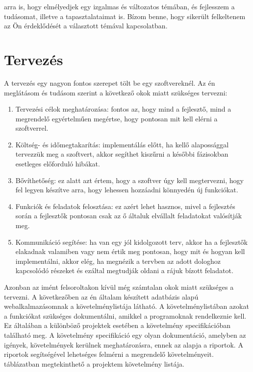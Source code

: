 \documentclass[]{thesis-ekf}
\theoremstyle{definition}
\theoremstyle{remark}
\begin{document}
arra is, hogy elmélyedjek egy izgalmas és változatos témában, és fejlesszem a tudásomat, illetve a tapasztalataimat is. Bízom benne, hogy sikerült felkeltenem az Ön érdeklődését a választott témával kapcsolatban. 
	
	\chapter{Tervezés}
		A tervezés egy nagyon fontos szerepet tölt be egy szoftvereknél. Az én meglátásom és tudásom szerint a következő okok miatt szükséges tervezni:
		\begin{enumerate}
			\item Tervezési célok meghatározása: fontos az, hogy mind a fejlesztő, mind a megrendelő egyértelműen megértse, hogy pontosan mit kell elérni a szoftverrel.
			\item Költség- és időmegtakarítás: implementálás előtt, ha kellő alapossággal tervezzük meg a szoftvert, akkor segíthet kiszűrni a későbbi fázisokban esetleges előforduló hibákat. 
			\item Bővíthetőség: ez alatt azt értem, hogy a szoftver úgy kell megtervezni, hogy fel legyen készítve arra, hogy lehessen hozzáadni könnyedén új funkciókat.
			\item Funkciók és feladatok felosztása: ez azért lehet hasznos, mivel a fejlesztés során a fejlesztők pontosan csak az ő általuk elvállalt feladatokat valósítják meg.
			\item Kommunikáció segítése: ha van egy jól kidolgozott terv, akkor ha a fejlesztők elakadnak valamiben vagy nem értik meg pontosan, hogy mit és hogyan kell implementálni, akkor elég, ha megnézik a tervben az adott dologhoz kapcsolódó részeket és ezáltal megtudják oldani a rájuk bízott feladatot.
		\end{enumerate}
		Azonban az imént felsoroltakon kívül még számtalan okok miatt szükséges a tervezni. A következőben az én általam készített adatbázis alapú webalkalmazásomnak a követelménylistája látható. A követelménylistában azokat a funkciókat szükséges dokumentálni, amikkel a programoknak rendelkeznie kell. Ez általában a különböző projektek esetében a követelmény specifikációban található meg. A követelmény specifikáció egy olyan dokumentáció, amelyben az igények, követelmények kerülnek meghatározásra, ennek az alapja a riportok. A riportok segítségével lehetséges felmérni a megrendelő követelményeit.  táblázatban megtekinthető a projektem követelmény listája.
		
\end{document}
